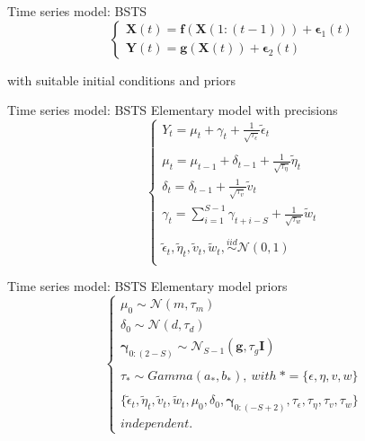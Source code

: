 \documentclass{beamer}
\begin{document}
\begin{frame}{Time series model: BSTS}
\begin{equation}
\begin{cases}
\mathbf{X}(t) = \mathbf{f}(\mathbf{X}(1:(t-1))) +  \boldsymbol{\epsilon}_1(t)\\
\mathbf{Y}(t) = \mathbf{g}(\mathbf{X}(t)) +  \boldsymbol{\epsilon}_2(t)
\end{cases}
\end{equation}

with \alert{suitable initial conditions and priors}
\end{frame}

\begin{frame}{Time series model: BSTS}
\alert{Elementary model} with precisions
\begin{equation}
\begin{cases}
Y_t = \mu_t + \gamma_t + \frac{1}{\sqrt{\tau_\epsilon}}\tilde{\epsilon}_t\\
\\
\mu_t = \mu_{t-1} + \delta_{t-1}+ \frac{1}{\sqrt{\tau_\eta}}\tilde{\eta}_t\\
\delta_t = \delta_{t-1} + \frac{1}{\sqrt{\tau_v}}\tilde{v}_t\\
\gamma_t = \sum_{i=1}^{S-1}\gamma_{t+i-S} + \frac{1}{\sqrt{\tau_w}}\tilde{w}_t\\
\\
\tilde{\epsilon}_t, \tilde{\eta}_t, \tilde{v}_t, \tilde{w}_t, \overset{iid}{\sim} \mathcal{N}(0,1)\\
\end{cases}
\end{equation}
\end{frame}

\begin{frame}{Time series model: BSTS}
Elementary model priors
\begin{equation}
\begin{cases}
\mu_0 \sim \mathcal{N}(m, \tau_m)\\
\delta_0 \sim \mathcal{N}(d, \tau_d)\\
\boldsymbol{\gamma}_{0:(2-S)} \sim \mathcal{N}_{S-1}(\mathbf{g}, \tau_g\mathbf{I})\\
\\
\tau_* \sim Gamma(a_*, b_*),\ with\ *=\{\epsilon, \eta, v,w\}\\
\\

\{\tilde{\epsilon}_t, \tilde{\eta}_t, \tilde{v}_t, \tilde{w}_t, \mu_0, \delta_0, \boldsymbol{\gamma}_{0:(-S+2)}, \tau_\epsilon, \tau_\eta, \tau_v, \tau_w\}\\
independent.
\end{cases}
\end{equation}
\end{frame}
\end{document}
